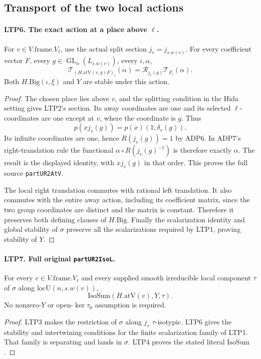 \documentclass[11pt,a4paper]{article}
\numberwithin{equation}{section}
\theoremstyle{remark}\newtheorem{remark}[theorem]{Remark}
\begin{document}
\subsection{Transport of the two local actions}

\paragraph{LTP6. The exact action at a place above \(\ell\).}
\label{claim:LTP6}
For \(v\in V.\mathrm{frame}.V_\ell\), use the actual split section
\(j_v=j_{s.w(v)}\).  For every coefficient vector \(F\), every
\(g\in\operatorname{GL}_n(L_{s.w(v)})\), every \(i,\alpha\),
\[
 \mathcal T_{(H.\mathrm{atV}(v,g)F)_i}(\alpha)
                 =\mathscr R_{j_v(g)}\mathcal T_{F_i}(\alpha).
\]
Both \(H.\mathrm{Big}(\iota,\xi)\) and \(Y\) are stable under this
action.
\begin{proof}
The chosen place lies above \(v\), and the splitting condition in
the Hida setting gives LTP2's section.  Its away coordinates are
one and its selected \(\ell\)-coordinates are one except at \(v\),
where the coordinate is \(g\).  Thus
\[
             p(xj_v(g))=p(x)(1,\delta_v(g)).
\]
Its infinite coordinates are one, hence \(R(j_v(g))=1\) by ADP6.
In ADP7's right-translation rule the functional
\(\alpha\circ R(j_v(g)^{-1})\) is therefore exactly \(\alpha\).
The result is the displayed identity, with \(xj_v(g)\) in that
order.  This proves the full source \texttt{part\allowbreak UR2At\allowbreak V}.

The local right translation commutes with rational left
translation.  It also commutes with the entire away action,
including its coefficient matrix, since the two group coordinates
are distinct and the matrix is constant.  Therefore it preserves
both defining clauses of \(H.\mathrm{Big}\).  Finally the
scalarization identity and global stability of \(\sigma\) preserve
all the scalarizations required by LTP1, proving stability of \(Y\).
\end{proof}

\paragraph{LTP7. Full original \texttt{part\allowbreak UR2Iso\allowbreak L}.}
\label{claim:LTP7}
For every \(v\in V.\mathrm{frame}.V_\ell\) and every supplied smooth
irreducible local component \(\tau\) of \(\sigma\) along
\(\mathrm{locU}(n,s.w(v))\),
\[
                  \mathrm{IsoSum}(H.\mathrm{atV}(v),Y,\tau).
\]
No nonzero-\(Y\) or open-\(\ker\tau_0\) assumption is required.
\begin{proof}
LTP3 makes the restriction of \(\sigma\) along \(j_v\)
\(\tau\)-isotypic.  LTP6 gives the stability and intertwining
conditions for the finite scalarization family of LTP1.
That family is separating and lands in \(\sigma\).
LTP4 proves the stated literal \(\mathrm{IsoSum}\).
\end{proof}
\end{document}
